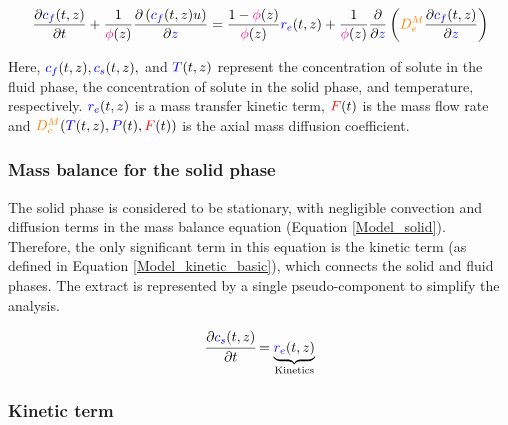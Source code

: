 \documentclass[../Article_Model_Parameters.tex]{subfiles}
\begin{document}
	{\footnotesize
		\begin{equation}
			\label{Model_fluid}
			\frac{\partial {\color{blue}c_f}(t,z)}{\partial t}
			+ \frac{1}{{\color{magenta}\phi}(z)} \frac{\partial \left( {\color{blue}c_f}(t,z) u\right)}{\partial {\color{blue}z}}
			= \frac{1-{\color{magenta}\phi}(z)}{{\color{magenta}\phi}(z)} {\color{blue}r_e}(t,z)
			+ \frac{1}{{\color{magenta}\phi}(z)} \frac{\partial}{\partial {\color{blue}z}} \left( {\color{orange}D^M_e} \frac{\partial {\color{blue}c_f}(t,z)}{\partial {\color{blue}z}} \right)
		\end{equation}
	}
	
	Here, ${\color{blue}c_f}(t,z), {\color{blue}c_s}(t,z),$ and ${\color{blue}T}(t,z)$ represent the concentration of solute in the fluid phase, the concentration of solute in the solid phase, and temperature, respectively. ${\color{blue}r_e}(t,z)$ is a mass transfer kinetic term, ${\color{red}F}(t)$ is the mass flow rate and ${\color{orange}D^M_e}({\color{blue}T}(t,z),{\color{blue}P}(t),{\color{red}F}(t))$ is the axial mass diffusion coefficient.
	
	\subsubsection{Mass balance for the solid phase} \label{Mass_balance_solid}
	
	The solid phase is considered to be stationary, with negligible convection and diffusion terms in the mass balance equation (Equation \ref{Model_solid}). Therefore, the only significant term in this equation is the kinetic term (as defined in Equation \ref{Model_kinetic_basic}), which connects the solid and fluid phases. The extract is represented by a single pseudo-component to simplify the analysis. 
	
	{\footnotesize
		\begin{equation} 
			\label{Model_solid}
					\cfrac{\partial {\color{blue}c_s}(t,z)}{\partial t} = \underbrace{ {\color{blue}r_e}(t,z) }_{\text{Kinetics}}
			\end{equation} }
			
	\subsubsection{Kinetic term} \label{CH: Kinetic}
	
	
\end{document}

